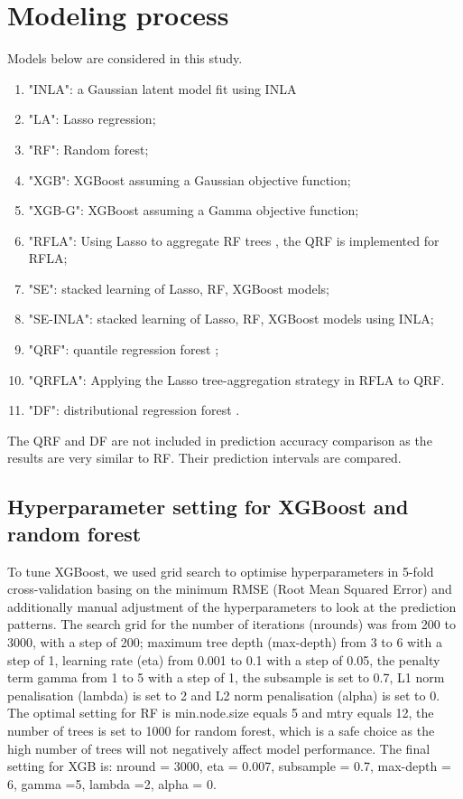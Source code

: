 \documentclass{article}
\begin{document}
\section{Modeling process}
 
Models below are considered in this study. 
\begin{enumerate}
\item "INLA": a Gaussian latent model fit using INLA %
\item "LA": Lasso regression; 
\item "RF": Random forest; 
\item "XGB": XGBoost assuming a Gaussian objective function; 
\item "XGB-G": XGBoost assuming a Gamma objective function; 
\item "RFLA": Using Lasso to aggregate RF trees \citep{hastie2009elements}, the QRF is implemented for RFLA; 
\item "SE": stacked learning of Lasso, RF, XGBoost models; 
\item "SE-INLA": stacked learning of Lasso, RF, XGBoost models using INLA;
\item "QRF": quantile regression forest \citep{meinshausen2006quantile};
\item "QRFLA": Applying the Lasso tree-aggregation strategy in RFLA to QRF. 
\item "DF": distributional regression forest \citep{schlosser2019distributional}.

\end{enumerate}

The QRF and DF are not included in prediction accuracy comparison as the results are very similar to RF. Their prediction intervals are compared. 

\subsection{Hyperparameter setting for XGBoost and random forest}
\label{sec:hp}

To tune XGBoost, we used grid search to optimise hyperparameters in 5-fold cross-validation basing on the minimum RMSE (Root Mean Squared Error) and additionally manual adjustment of the hyperparameters to look at the prediction patterns. The search grid for the number of iterations (nrounds) was from 200 to 3000, with a step of 200; maximum tree depth (max-depth) from 3 to 6 with a step of 1, learning rate (eta) from 0.001 to 0.1 with a step of 0.05, the penalty term gamma \citep{xgboost}  from 1 to 5 with a step of 1, the subsample is set to 0.7, L1 norm penalisation (lambda) is set to 2 and L2 norm penalisation (alpha) is set to 0.  The optimal setting for RF is min.node.size equals 5 and mtry equals 12, the number of trees is set to 1000 for random forest, which is a safe choice as the high number of trees will not negatively affect model performance. The final setting for XGB is: nround = 3000, eta = 0.007, subsample = 0.7, max-depth = 6, gamma =5, lambda =2, alpha = 0. 
\end{document}
